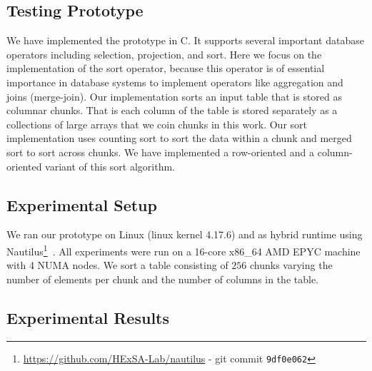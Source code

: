 \documentclass[conference]{IEEEtran}
\begin{document}
\subsection{Testing Prototype}
\label{sec:testing-prototype}

We have implemented the prototype in C. It supports several important database operators including selection, projection, and sort.  Here we focus on the implementation of the sort operator, because this  operator is of essential importance in database systems to implement operators like aggregation and joins (merge-join). Our implementation sorts an input table that is stored as columnar chunks. That is each column of the table is stored separately as a collections of large arrays that we coin chunks in this work. Our sort implementation uses counting sort to sort the data within a chunk and merged sort to sort across chunks. We have implemented a row-oriented and a column-oriented variant of this sort algorithm.

\subsection{Experimental Setup}
\label{sec:experimental-setup}

We ran our prototype on Linux (linux kernel 4.17.6) and as hybrid runtime using Nautilus\footnote{\url{https://github.com/HExSA-Lab/nautilus} - git commit \texttt{9df0e062}}~\cite{HALE:2015:NAUTILUS,HALE:2016:HRTHVM}. 
All experiments were run on a 16-core x86\_64 AMD EPYC machine with 4 NUMA nodes.
We sort a table consisting of  $256$ chunks varying the number of elements per chunk and the number of columns in the table.

\subsection{Experimental Results}
\label{sec:experimental-results}
\end{document}

